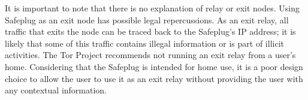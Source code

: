 \documentclass[letterpaper,twocolumn,10pt]{article}
\begin{document}





It is important to note that there is no explanation of relay or exit nodes.  Using Safeplug as an exit node has possible legal repercussions.  As an exit relay, all traffic that exits the node can be traced back to the Safeplug's IP address; it is likely that some of this traffic contains illegal information or is part of illicit activities.  The Tor Project recommends not running an exit relay from a user's home.  Considering that the Safeplug is intended for home use, it is a poor design choice to allow the user to use it as an exit relay without providing the user with any contextual information.


\end{document}
